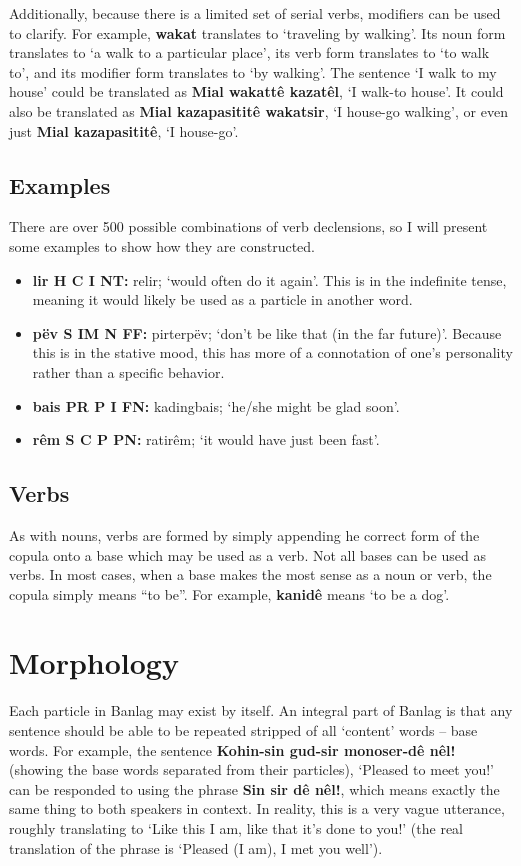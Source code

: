 \documentclass[12pt]{report}
\begin{document}
Additionally, because there is a limited set of serial verbs, modifiers can be used to clarify. For example, \textbf{wakat} translates to `traveling by walking'. Its noun form translates to `a walk to a particular place', its verb form translates to `to walk to', and its modifier form translates to `by walking'. The sentence `I walk to my house' could be translated as \textbf{Mial wakatt\^e kazat\^el}, `I walk-to house'. It could also be translated as \textbf{Mial kazapasitit\^e wakatsir}, `I house-go walking', or even just \textbf{Mial kazapasitit\^e}, `I house-go'. 

\section{Examples}
There are over 500 possible combinations of verb declensions, so I will present some examples to show how they are constructed.

\begin{itemize}
\item \textbf{lir \tiny{H C I NT}:} relir; `would often do it again'. This is in the indefinite tense, meaning it would likely be used as a particle in another word.
\item \textbf{p\"ev \tiny{S IM N FF}:} pirterp\"ev; `don't be like that (in the far future)'. Because this is in the stative mood, this has more of a connotation of one's personality rather than a specific behavior.
\item \textbf{bais \tiny{PR P I FN}:} kadingbais; `he/she might be glad soon'.
\item \textbf{r\^em \tiny{S C P PN}:} ratir\^em; `it would have just been fast'.
\end{itemize}

\section{Verbs}
As with nouns, verbs are formed by simply appending he correct form of the copula onto a base which may be used as a verb. Not all bases can be used as verbs. In most cases, when a base makes the most sense as a noun or verb, the copula simply means ``to be''. For example, \textbf{kanid\^e} means `to be a dog'. 

\chapter{Morphology}
Each particle in Banlag may exist by itself. An integral part of Banlag is that any sentence should be able to be repeated stripped of all `content' words -- base words. For example, the sentence \textbf{Kohin-sin gud-sir monoser-d\^e n\^el!} (showing the base words separated from their particles), `Pleased to meet you!' can be responded to using the phrase \textbf{Sin sir d\^e n\^el!}, which means exactly the same thing to both speakers in context. In reality, this is a very vague utterance, roughly translating to `Like this I am, like that it's done to you!' (the real translation of the phrase is `Pleased (I am), I met you well').
\end{document}

